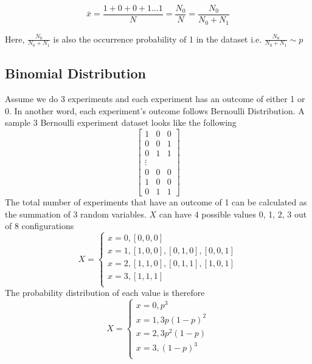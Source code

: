 \documentclass[12pt, oneside]{article}
\begin{document}
$$\bar{x}=\frac{1+0+0+1...1}{N}=\frac{N_0}{N}=\frac{N_0}{N_0+N_1}$$

Here,
$\frac{N_0}{N_0+N_1}$ is also the occurrence probability of 1 in the dataset i.e. $\frac{N_0}{N_0+N_1}\sim p$

\subsection{Binomial Distribution}
Assume we do 3 experiments and each experiment has an outcome of either 1 or 0. In another word, each experiment's outcome follows Bernoulli Distribution. A sample 3 Bernoulli experiment dataset looks like the following
\[
\begin{bmatrix}
    1 & 0  &0 \\
    0 & 0  &1 \\
    0 & 1  &1 \\
    \vdots \\
    0 &0  &0\\
    1 & 0  &0 \\
    0 &1  &1
\end{bmatrix}
\]
The total number of experiments that have an outcome of 1 can be calculated as the summation of 3 random variables. 
$X$ can have 4 possible values 0, 1, 2, 3 out of 8 configurations
\begin{equation*}
X=
\begin{cases}
x=0, [0, 0, 0]\\
x=1, [1, 0, 0], [0, 1, 0], [0, 0, 1]\\
x=2, [1, 1, 0], [0, 1, 1], [1, 0, 1]\\
x=3, [1, 1, 1]\\
\end{cases}
\end{equation*}
The probability distribution of each value is therefore
\begin{equation*}
X=
\begin{cases}
x=0, p^3\\
x=1, 3p(1-p)^2\\
x=2, 3p^2(1-p)\\
x=3, (1-p)^3\\
\end{cases}
\end{equation*}
\end{document}
